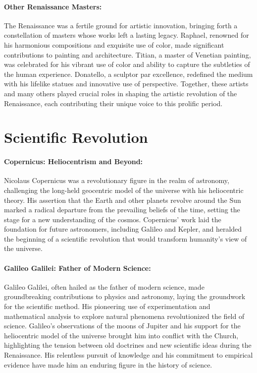 \documentclass[a4paper,12pt]{book}
\begin{document}
\paragraph{Other Renaissance Masters:}
The Renaissance was a fertile ground for artistic innovation, bringing forth a constellation of masters whose works left a lasting legacy. Raphael, renowned for his harmonious compositions and exquisite use of color, made significant contributions to painting and architecture. Titian, a master of Venetian painting, was celebrated for his vibrant use of color and ability to capture the subtleties of the human experience. Donatello, a sculptor par excellence, redefined the medium with his lifelike statues and innovative use of perspective. Together, these artists and many others played crucial roles in shaping the artistic revolution of the Renaissance, each contributing their unique voice to this prolific period.

\section*{Scientific Revolution}

\paragraph{Copernicus: Heliocentrism and Beyond:}
Nicolaus Copernicus was a revolutionary figure in the realm of astronomy, challenging the long-held geocentric model of the universe with his heliocentric theory. His assertion that the Earth and other planets revolve around the Sun marked a radical departure from the prevailing beliefs of the time, setting the stage for a new understanding of the cosmos. Copernicus’ work laid the foundation for future astronomers, including Galileo and Kepler, and heralded the beginning of a scientific revolution that would transform humanity’s view of the universe.

\paragraph{Galileo Galilei: Father of Modern Science:}
Galileo Galilei, often hailed as the father of modern science, made groundbreaking contributions to physics and astronomy, laying the groundwork for the scientific method. His pioneering use of experimentation and mathematical analysis to explore natural phenomena revolutionized the field of science. Galileo’s observations of the moons of Jupiter and his support for the heliocentric model of the universe brought him into conflict with the Church, highlighting the tension between old doctrines and new scientific ideas during the Renaissance. His relentless pursuit of knowledge and his commitment to empirical evidence have made him an enduring figure in the history of science.
\end{document}
